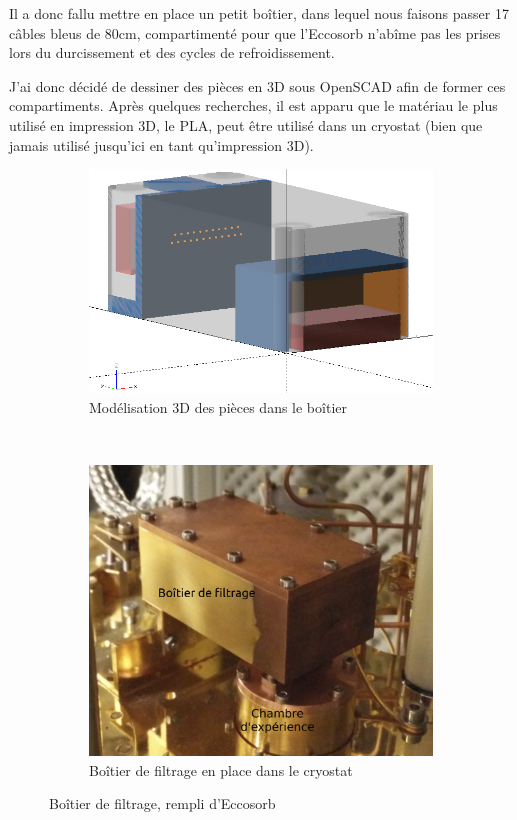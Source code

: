 Il a donc fallu mettre en place un petit boîtier, dans lequel nous faisons passer 17 câbles bleus de 80cm, compartimenté pour que l'Eccosorb n'abîme pas les prises lors du durcissement et des cycles de refroidissement.

J'ai donc décidé de dessiner des pièces en 3D sous OpenSCAD afin de former ces compartiments. Après quelques recherches, il est apparu que le matériau le plus utilisé en impression 3D, le PLA, peut être utilisé dans un cryostat (bien que jamais utilisé jusqu'ici en tant qu'impression 3D).

\begin{figure}[h]
    \centering
    \begin{subfigure}[t]{0.59\textwidth}
        \centering
        \includegraphics[height=0.633\textwidth]{Images/Thermalisation/Filtrage3D}
        \caption{Modélisation 3D des pièces dans le boîtier}
    \end{subfigure}%
    ~ 
    \begin{subfigure}[t]{0.39\textwidth}
        \centering
        \includegraphics[height=0.95\textwidth]{Images/Thermalisation/Filtrage}
        \caption{Boîtier de filtrage en place dans le cryostat}
    \end{subfigure}
    \caption{Boîtier de filtrage, rempli d'Eccosorb}
\end{figure}


